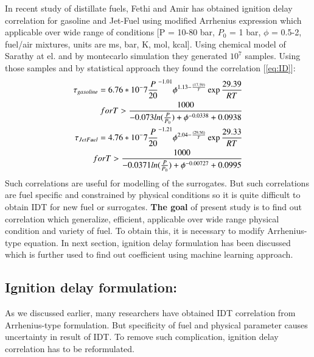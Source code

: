 \documentclass[preprint,12pt]{elsarticle}
\begin{document}
		In recent study of distillate fuels, Fethi and Amir \cite{khaled2019universality} has obtained ignition delay correlation for gasoline and Jet-Fuel using modified Arrhenius expression which applicable over wide range of conditions  [P = 10-80 bar, $P_0$ = 1 bar, $\phi$ = 0.5-2, fuel/air mixtures, units are ms, bar, K, mol, kcal]. Using chemical model of Sarathy at el. and by montecarlo simulation they generated $10^7$ samples. Using those samples and by statistical approach they found the correlation [\ref{eq:ID}]:	
		\begin{equation} \label{eq:ID}
		\begin{split}
		\tau_{gasoline} = 6.76*10^-7\frac{P}{20}^{-1.01} \phi^{1.13 - \frac{(17.59)}{T}} \exp{\frac{29.39}{RT}}\\			\newline
		for T > \frac{1000}{-0.073 ln(\frac{P}{P_0})+ \phi^{-0.0338} + 0.0938}\\
		\tau_{JetFuel} = 4.76*10^-7\frac{P}{20}^{-1.21} \phi^{2.04 - \frac{(29.56)}{T}} \exp{\frac{29.33}{RT}}\\			\newline
		for T > \frac{1000}{-0.0371 ln(\frac{P}{P_0})+ \phi^{-0.00727} + 0.0995}
		\end{split}
		\end{equation}
		Such correlations are useful for modelling of the surrogates. But such correlations are fuel specific and constrained by physical conditions so it is  quite difficult to obtain IDT for new fuel or surrogates.\textbf{ The goal} of present study is to find out correlation which generalize, efficient, applicable over wide range physical condition and variety of fuel. To obtain this, it is necessary to modify Arrhenius-type equation. In next section, ignition delay formulation has been discussed which is further used to find out coefficient using machine learning approach. 
		
		\subsection{Ignition delay formulation:}
		
		As we discussed earlier, many researchers have obtained IDT correlation from Arrhenius-type formulation. But specificity of fuel and physical parameter causes uncertainty in result of IDT. To remove such complication, ignition delay correlation has to be reformulated. 
		
\end{document}
